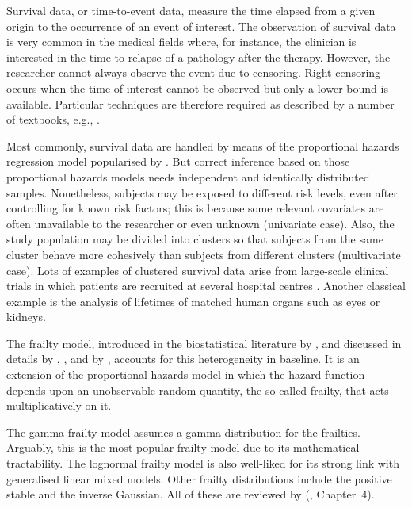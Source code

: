 Survival data, or time-to-event data, measure the time 
  elapsed from a given origin to the occurrence of an event of interest.
The observation of survival data is very common in the medical fields
  where, for instance, the clinician is interested in the time to relapse of a pathology after the therapy.
However, the researcher cannot always observe the event due to censoring. 
Right-censoring occurs when the time of interest cannot be observed but only a lower bound is available. 
Particular techniques are therefore required as described by a number of textbooks, e.g., \cite{KleinMoeschberger2003}.

Most commonly, survival data 
are handled by means of the proportional hazards regression model popularised by \cite{Cox72}.
But correct inference based on those proportional hazards models needs independent and identically distributed samples.
Nonetheless, subjects may be exposed to different risk levels, even after controlling for known risk factors;
	this is because some relevant covariates are often unavailable to the researcher or even unknown (univariate case).
Also, the study population may be divided into clusters so that subjects from the same cluster behave more cohesively than subjects from different clusters (multivariate case).
Lots of examples of clustered survival data arise from large-scale clinical trials
  in which patients are recruited at several hospital centres \citep{DuchateauEtal02, GliddenVittinghoff04}.
  Another classical example
  is the analysis of lifetimes of matched human organs such as eyes or kidneys.


The frailty model, introduced in the biostatistical literature by 
  \cite{VaupelEtal79}, and discussed in details
  by \cite{Hougaard00}, \cite{DuchateauJanssen08}, and by \cite{Wienke10}, 
  accounts for this heterogeneity in baseline.
It is an extension of the proportional hazards model in which the hazard function
    depends upon an unobservable random quantity, the so-called frailty, that acts multiplicatively on it.
  
The gamma frailty model assumes a gamma distribution for the frailties.
Arguably, this is the most popular frailty model due to its mathematical tractability.
The lognormal frailty model is also well-liked for its strong link with generalised linear mixed models.
Other frailty distributions include the positive stable and the inverse Gaussian.
All of these are reviewed by \citeauthor{DuchateauJanssen08} (\citeyear{DuchateauJanssen08}, Chapter~4).

